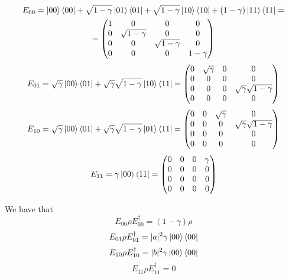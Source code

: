 \documentclass{masterthesis}
\begin{document}
\begin{multline}\label{eq:op-el-1}
    E_{00} = \ket{00}\bra{00} + \sqrt{1-\gamma}\ket{01}\bra{01} + \sqrt{1-\gamma}\ket{10}\bra{10} + (1-\gamma)\ket{11}\bra{11} = \\
    = \begin{pmatrix} 1 & 0 & 0 & 0 \\ 0 & \sqrt{1-\gamma} & 0 & 0 \\ 0 & 0 & \sqrt{1-\gamma} & 0 \\ 0 & 0 & 0 & 1-\gamma \end{pmatrix}
\end{multline}
\begin{equation}\label{eq:op-el-2}
    E_{01} = \sqrt{\gamma}\ket{00}\bra{01} + \sqrt{\gamma}\sqrt{1-\gamma}\ket{10}\bra{11}
    = \begin{pmatrix} 0 & \sqrt{\gamma} & 0 & 0 \\ 0 & 0 & 0 & 0 \\ 0 & 0 & 0 & \sqrt{\gamma}\sqrt{1-\gamma} \\ 0 & 0 & 0 & 0 \end{pmatrix}
\end{equation}
\begin{equation}\label{eq:op-el-3}
    E_{10} = \sqrt{\gamma}\ket{00}\bra{01} + \sqrt{\gamma}\sqrt{1-\gamma}\ket{01}\bra{11}  
    = \begin{pmatrix} 0 & 0 & \sqrt{\gamma} & 0 \\ 0 & 0 & 0 & \sqrt{\gamma}\sqrt{1-\gamma} \\ 0 & 0 & 0 & 0 \\ 0 & 0 & 0 & 0 \end{pmatrix}
\end{equation}
\begin{equation}\label{eq:op-el-4}
    E_{11} = \gamma \ket{00}\bra{11}
    = \begin{pmatrix} 0 & 0 & 0 & \gamma \\ 0 & 0 & 0 & 0 \\ 0 & 0 & 0 & 0 \\ 0 & 0 & 0 & 0 \end{pmatrix}
\end{equation}

We have that
\begin{equation}
    E_{00} \rho E_{00}^{\dagger} = (1-\gamma) \rho
\end{equation}
\begin{equation}
    E_{01} \rho E_{01}^{\dagger} = |a|^2 \gamma \ket{00}\bra{00}
\end{equation}
\begin{equation}
    E_{10} \rho E_{10}^{\dagger} = |b|^2 \gamma \ket{00}\bra{00}
\end{equation}
\begin{equation}
    E_{11} \rho E_{11}^{\dagger} = 0
\end{equation}
\end{document}
